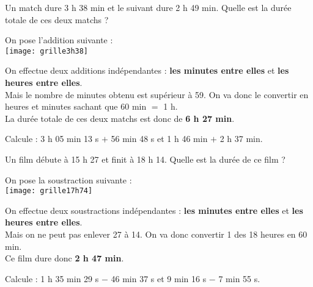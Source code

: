 \begin{methode*1}

\begin{exemple*1}
Un match dure 3 h 38 min et le suivant dure 2 h 49 min. Quelle est la durée totale de ces deux matchs ? \\[1em]
\begin{minipage}[t]{.4\textwidth}
On pose l'addition suivante :\\[0.2em]

\texttt{[image: grille3h38]}
\end{minipage}\hfill%
\begin{minipage}[t]{.58\textwidth}
On effectue deux additions indépendantes : 
\textcolor{vert}{\textbf{les minutes entre elles}} et \textcolor{bleu}{\textbf{les heures entre elles}}.\\[0.75em]
Mais le nombre de minutes obtenu est supérieur à 59. 
On va donc le convertir en heures et minutes sachant que 60 min $=$ 1 h. \\[0.75em]
La durée totale de ces deux matchs est donc de \textcolor{rose}{\textbf{6 h 27 min}}.
\end{minipage}

\end{exemple*1}

\exercice

Calcule : 3 h 05 min 13 s $+$ 56 min 48 s et 1 h 46 min $+$ 2 h 37 min.

\end{methode*1}


\begin{methode*1}

\begin{exemple*1}
Un film débute à 15 h 27 et finit à 18 h 14. Quelle est la durée de ce film ? \\[1em]

\begin{minipage}[t]{.4\textwidth}
On pose la soustraction suivante :\\[0.2em]

\texttt{[image: grille17h74]}
\end{minipage}\hfill%
\begin{minipage}[t]{.58\textwidth}
On effectue deux soustractions indépendantes : 
\textcolor{vert}{\textbf{les minutes entre elles}} et \textcolor{bleu}{\textbf{les heures entre elles}}.\\[0.75em]
Mais on ne peut pas enlever 27 à 14. 
On va donc convertir 1 des 18 heures en 60 min. \\[0.75em]
Ce film dure donc \textcolor{rose}{\textbf{2 h 47 min}}.
\end{minipage}

\end{exemple*1}

\exercice

Calcule : 1 h 35 min 29 s $-$ 46 min 37 s et 9 min 16 s $-$ 7 min 55 s.


\end{methode*1}
